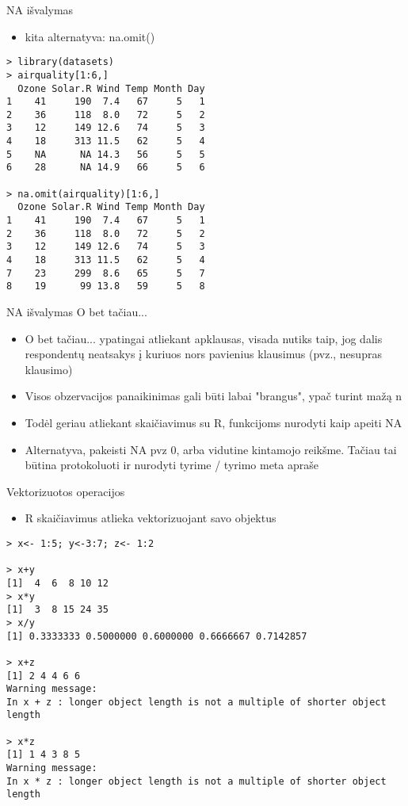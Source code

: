 \documentclass[11pt,xcolor=table]{beamer}
\begin{document}

\begin{frame}[fragile]{NA išvalymas}
\begin{itemize}
\item kita alternatyva: na.omit()
\end{itemize}
\begin{lstlisting}
> library(datasets)
> airquality[1:6,]
  Ozone Solar.R Wind Temp Month Day
1    41     190  7.4   67     5   1
2    36     118  8.0   72     5   2
3    12     149 12.6   74     5   3
4    18     313 11.5   62     5   4
5    NA      NA 14.3   56     5   5
6    28      NA 14.9   66     5   6

> na.omit(airquality)[1:6,]
  Ozone Solar.R Wind Temp Month Day
1    41     190  7.4   67     5   1
2    36     118  8.0   72     5   2
3    12     149 12.6   74     5   3
4    18     313 11.5   62     5   4
7    23     299  8.6   65     5   7
8    19      99 13.8   59     5   8
\end{lstlisting}
\end{frame}



\begin{frame}[fragile]{NA išvalymas}
O bet tačiau...
\begin{itemize}
\item O bet tačiau... ypatingai atliekant apklausas, visada nutiks taip, jog dalis respondentų neatsakys į kuriuos nors pavienius klausimus (pvz., nesupras klausimo)
\item Visos obzervacijos panaikinimas gali būti labai "brangus", ypač turint mažą n
\item Todėl geriau atliekant skaičiavimus su R, funkcijoms nurodyti kaip apeiti NA
\item Alternatyva, pakeisti NA pvz 0, arba vidutine kintamojo reikšme. Tačiau tai būtina protokoluoti ir nurodyti tyrime / tyrimo meta apraše

\end{itemize}
\end{frame}


\begin{frame}[fragile]{Vektorizuotos operacijos}
\begin{itemize}
\item R skaičiavimus atlieka vektorizuojant savo objektus
\end{itemize}
\begin{lstlisting}
> x<- 1:5; y<-3:7; z<- 1:2

> x+y
[1]  4  6  8 10 12
> x*y
[1]  3  8 15 24 35
> x/y
[1] 0.3333333 0.5000000 0.6000000 0.6666667 0.7142857

> x+z
[1] 2 4 4 6 6
Warning message:
In x + z : longer object length is not a multiple of shorter object length

> x*z
[1] 1 4 3 8 5
Warning message:
In x * z : longer object length is not a multiple of shorter object length
\end{lstlisting}
\end{frame}
\end{document}
